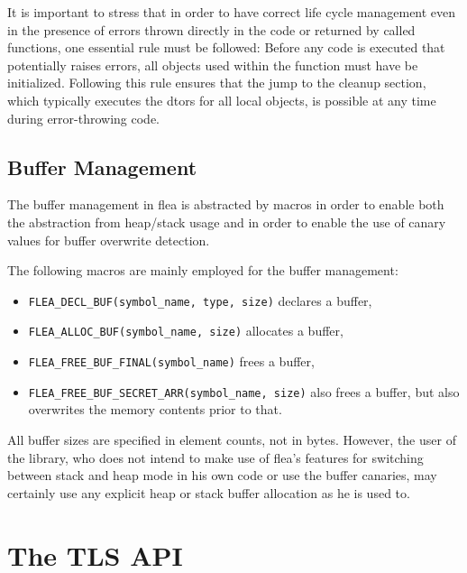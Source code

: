 \documentclass[a4paper,11pt]{scrartcl}
\begin{document}
It is important to stress that in order to have correct life cycle management even in the presence of errors
thrown directly in the code or returned by called functions, one essential rule must be followed:
Before any code is executed that potentially raises errors, all objects 
used within the function must have be initialized. 
Following this rule ensures that the jump to the cleanup section, which
typically executes the dtors for all local objects, is possible at any time
during error-throwing code.

\subsection{Buffer Management}
The buffer management in flea is abstracted by macros in order to enable both
the abstraction from heap/stack usage and in order to enable the use of canary
values for buffer overwrite detection.

The following  macros are mainly employed for the buffer management:
\begin{itemize}
  \item \verb#FLEA_DECL_BUF(symbol_name, type, size)# declares a buffer, 
  \item \verb#FLEA_ALLOC_BUF(symbol_name, size)# allocates a buffer, 
  \item \verb#FLEA_FREE_BUF_FINAL(symbol_name)# frees a buffer,
  \item \verb#FLEA_FREE_BUF_SECRET_ARR(symbol_name, size)# also frees a buffer,
    but also overwrites the memory contents prior to that.
\end{itemize}
All buffer sizes are specified in element counts, not in bytes. However, the
user of the library, who does not intend to make use of flea's features for 
switching between stack and heap mode in his own code or use the buffer
canaries, may certainly use any explicit heap or stack buffer allocation as he
is used to.



\section{The TLS API}
\end{document}
